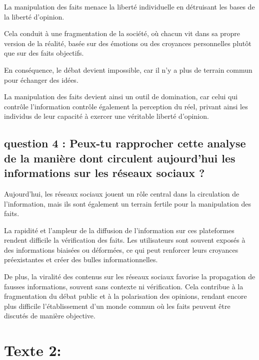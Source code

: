 \documentclass[a4paper,12pt]{article}
\begin{document}
La manipulation des faits menace la liberté individuelle en détruisant les bases de la liberté d’opinion. 

Cela conduit à une fragmentation de la société, où chacun vit dans sa propre version de la réalité, basée sur des émotions ou des croyances personnelles plutôt que sur des faits objectifs. 

En conséquence, le débat devient impossible, car il n’y a plus de terrain commun pour échanger des idées. 

La manipulation des faits devient ainsi un outil de domination, car celui qui contrôle l’information contrôle également la perception du réel, privant ainsi les individus de leur capacité à exercer une véritable liberté d’opinion.

\subsection{question 4 : Peux-tu rapprocher cette analyse de la manière dont circulent aujourd’hui les
informations sur les réseaux sociaux ?}
Aujourd’hui, les réseaux sociaux jouent un rôle central dans la circulation de l’information, mais ils sont également un terrain fertile pour la manipulation des faits.

La rapidité et l’ampleur de la diffusion de l’information sur ces plateformes rendent difficile la vérification des faits. Les utilisateurs sont souvent exposés à des informations biaisées ou déformées, ce qui peut renforcer leurs croyances préexistantes et créer des bulles informationnelles. 

De plus, la viralité des contenus sur les réseaux sociaux favorise la propagation de fausses informations, souvent sans contexte ni vérification. Cela contribue à la fragmentation du débat public et à la polarisation des opinions, rendant encore plus difficile l’établissement d’un monde commun où les faits peuvent être discutés de manière objective.


\section{Texte 2: }
\end{document}
